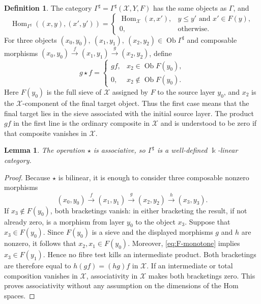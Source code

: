 \documentclass[12pt,a4paper,english,reqno]{amsart}
\theoremstyle{plain}
\newtheorem{lemma}[theorem]{Lemma}
\theoremstyle{definition}
\newtheorem{definition}[theorem]{Definition}
\newcommand{\kk}{\Bbbk}
\newcommand{\Hom}{\operatorname{Hom}}
\newcommand{\X}{\mathcal X}
\newcommand{\G}{\Gamma}
\newcommand{\Gs}{\Gamma^{\sharp}}
\begin{document}
\begin{definition}
\label{def:Gamma-sharp}
The category $\Gs=\Gs(\X,Y,F)$ has the same objects as $\G$, and
\begin{equation}
 \Hom_{\Gs}((x,y),(x',y'))=
 \begin{cases}
 \Hom_{\X}(x,x'),&y\leq y'\text{ and }x'\in F(y),\\
 0,&\text{otherwise}.
 \end{cases}
\label{eq:Gamma-sharp-hom}
\end{equation}
For three objects $(x_0,y_0),\ (x_1,y_1),\ (x_2,y_2)\in\operatorname{Ob}\Gs$
and composable morphisms
$(x_0,y_0)\xrightarrow{f}(x_1,y_1)
\xrightarrow{g}(x_2,y_2)$,
define
\begin{equation}
g\star f=
\begin{cases}
gf, & x_2\in\operatorname{Ob}F(y_0),\\
0,  & x_2\notin\operatorname{Ob}F(y_0).
\end{cases}
\label{eq:sharp-composition}
\end{equation}
Here $F(y_0)$ is the full sieve of $\X$ assigned by $F$ to the
source layer $y_0$, and $x_2$ is the $\X$-component of the final
target object. Thus the first case means that the final target lies
in the sieve associated with the initial source layer. The product
$gf$ in the first line is the ordinary composite in $\X$ and is
understood to be zero if that composite vanishes in $\X$.
\end{definition}





\begin{lemma}
\label{lem:associativity}
The operation $\star$ is associative, so $\Gs$ is a well-defined
$\kk$-linear category.
\end{lemma}

\begin{proof}
Because $\star$ is bilinear, it is enough to consider three composable
nonzero morphisms
\[
 (x_0,y_0)\xrightarrow{f}(x_1,y_1)
 \xrightarrow{g}(x_2,y_2)
 \xrightarrow{h}(x_3,y_3).
\]
If $x_3\notin F(y_0)$, both bracketings vanish: in either bracketing the
result, if not already zero, is a morphism from layer $y_0$ to the object
$x_3$.  Suppose that $x_3\in F(y_0)$.  Since $F(y_0)$ is a sieve and
the displayed morphisms $g$ and $h$ are nonzero, it follows that $x_2,x_1\in F(y_0)$.
Moreover, \eqref{eq:F-monotone} implies $x_3\in F(y_1)$.  Hence no fibre
test kills an intermediate product.  Both bracketings are therefore equal to
$h(gf)=(hg)f$ in $\X$.  If an intermediate or total composition vanishes
in $\X$, associativity in $\X$ makes both bracketings zero.  This proves
associativity without any assumption on the dimensions of the Hom spaces.
\end{proof}
\end{document}
